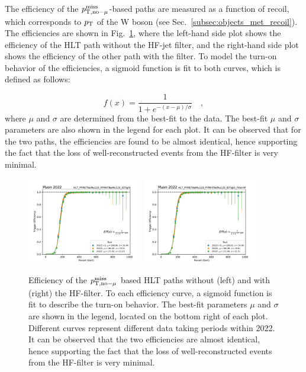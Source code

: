 The efficiency of the $p_{\textrm{T},\textrm{no}-\mu}^{\textrm{miss}}$-based paths are measured as a function of recoil, which corresponds to $p_{\textrm{T}}$ of the W boson (see Sec.~\ref{subsec:objects_met_recoil}). 
The efficiencies are shown in Fig.~\ref{fig:filterhf_efficiency}, where the left-hand side plot shows the efficiency of the HLT path without the HF-jet filter, and the right-hand side plot
shows the efficiency of the other path with the filter. To model the turn-on behavior of the efficiencies, a sigmoid function is fit to both curves, which is defined as follows:

\begin{equation}
    f(x) = \frac{1}{1 + e^{-(x - \mu)/\sigma}} \quad ,
\end{equation}
where $\mu$ and $\sigma$ are determined from the best-fit to the data. The best-fit $\mu$ and $\sigma$ parameters are also shown in the legend for each plot.
It can be observed that for the two paths, the efficiencies are found to be almost identical, hence
supporting the fact that the loss of well-reconstructed events from the HF-filter is very minimal.  

\begin{figure}[htbp]
    \centering
    \includegraphics[width=0.45\textwidth]{HFFilter/merged_2022-10-27_hlt_Muon_2022_JMEtriggers/turnons_tr_metnomu.pdf}
    \includegraphics[width=0.45\textwidth]{HFFilter/merged_2022-10-27_hlt_Muon_2022_JMEtriggers/turnons_tr_metnomu_filterhf.pdf}
    \caption{Efficiency of the $p_{\textrm{T},\textrm{no}-\mu}^{\textrm{miss}}$ based HLT paths without (left) and with (right) the HF-filter. To each efficiency curve, a sigmoid function is fit
    to describe the turn-on behavior. The best-fit parameters $\mu$ and $\sigma$ are shown in the legend, located on the bottom right of each plot. Different curves
    represent different data taking periods within 2022.
    It can be observed that the two efficiencies are almost identical, hence supporting the fact that the loss of well-reconstructed 
    events from the HF-filter is very minimal.}
    \label{fig:filterhf_efficiency}
\end{figure}

